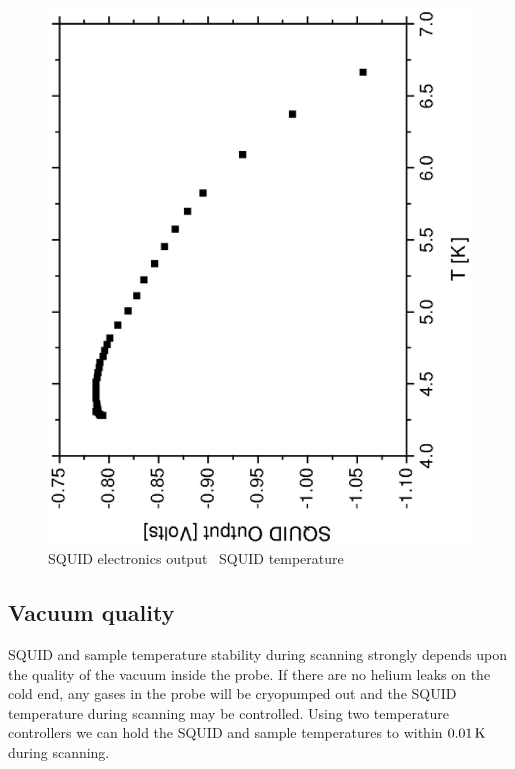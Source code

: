 % 
\begin{figure}[p]
\includegraphics[width=5.7in]{figs/appendixA/fig1_rot.ps}
\caption[SQUID electronics output \vs\ SQUID temperature]
{SQUID electronics output \vs\ SQUID temperature}
\label{fig:squid_vs_temperature}
\end{figure}



\subsection{Vacuum quality}

SQUID and sample
temperature stability 
during scanning strongly depends upon the quality of the 
vacuum inside the probe. If there are no helium leaks
on the cold end, any gases in the probe will be 
cryopumped out and the SQUID temperature during scanning may be
controlled.
Using two temperature controllers
we can hold the SQUID and
sample temperatures to within $0.01\,\kelvin$ during scanning. 

